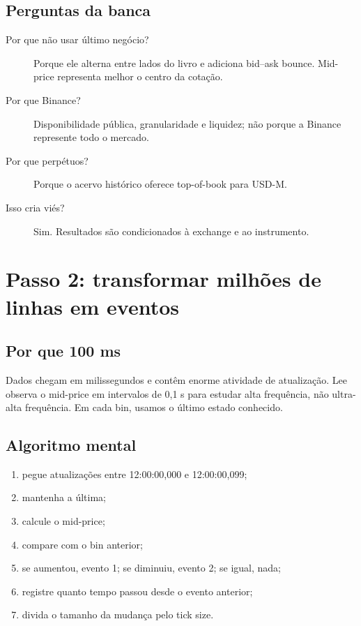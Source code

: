 \documentclass[12pt,a4paper,openany]{report}
\begin{document}
\section{Perguntas da banca}

\begin{description}
  \item[Por que não usar último negócio?] Porque ele alterna entre lados do livro e
  adiciona bid--ask bounce. Mid-price representa melhor o centro da cotação.
  \item[Por que Binance?] Disponibilidade pública, granularidade e liquidez; não porque
  a Binance represente todo o mercado.
  \item[Por que perpétuos?] Porque o acervo histórico oferece top-of-book para USD-M.
  \item[Isso cria viés?] Sim. Resultados são condicionados à exchange e ao instrumento.
\end{description}

\chapter{Passo 2: transformar milhões de linhas em eventos}

\section{Por que 100 ms}

Dados chegam em milissegundos e contêm enorme atividade de atualização. Lee observa o
mid-price em intervalos de 0,1 s para estudar alta frequência, não ultra-alta frequência.
Em cada bin, usamos o último estado conhecido.

\section{Algoritmo mental}

\begin{enumerate}
  \item pegue atualizações entre 12:00:00,000 e 12:00:00,099;
  \item mantenha a última;
  \item calcule o mid-price;
  \item compare com o bin anterior;
  \item se aumentou, evento 1; se diminuiu, evento 2; se igual, nada;
  \item registre quanto tempo passou desde o evento anterior;
  \item divida o tamanho da mudança pelo tick size.
\end{enumerate}
\end{document}
